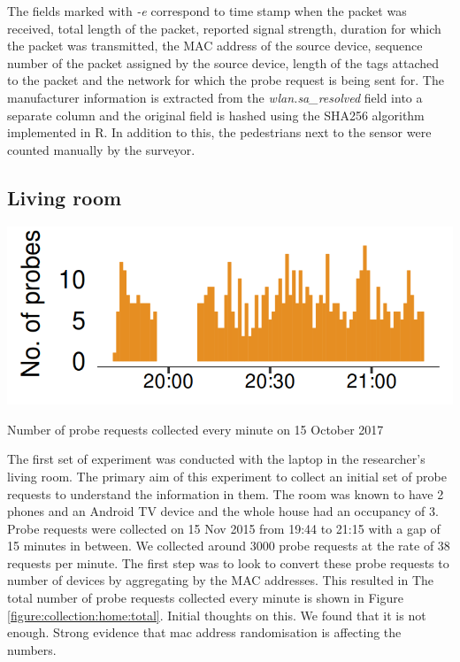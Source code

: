 The fields marked with \textit{-e} correspond to time stamp when the packet was received, total length of the packet, reported signal strength, duration for which the packet was transmitted, the MAC address of the source device, sequence number of the packet assigned by the source device, length of the tags attached to the packet and the network for which the probe request is being sent for.
The manufacturer information is extracted from the \textit{wlan.sa\_resolved} field into a separate column and the original field is hashed using the SHA256 algorithm implemented in R.
In addition to this, the pedestrians next to the sensor were counted manually by the surveyor.

\subsection{Living room}

\begin{marginfigure}
  \forcerectofloat
  \includegraphics{images/home-total-count.png}
  \caption{Number of probe requests collected every minute on 15 October 2017}
  \label{figure:collection:home:total}
\end{marginfigure}

The first set of experiment was conducted with the laptop in the researcher's living room.
The primary aim of this experiment to collect an initial set of probe requests to understand the information in them.
The room was known to have 2 phones and an Android TV device and the whole house had an occupancy of 3.
Probe requests were collected on 15 Nov 2015 from 19:44 to 21:15 with a gap of 15 minutes in between.
We collected around 3000 probe requests at the rate of 38 requests per minute.
The first step was to look to convert these probe requests to number of devices by aggregating by the MAC addresses.
This resulted in 
The total number of probe requests collected every minute is shown in Figure \ref{figure:collection:home:total}.
Initial thoughts on this.
We found that it is not enough.
Strong evidence that mac address randomisation is affecting the numbers.

